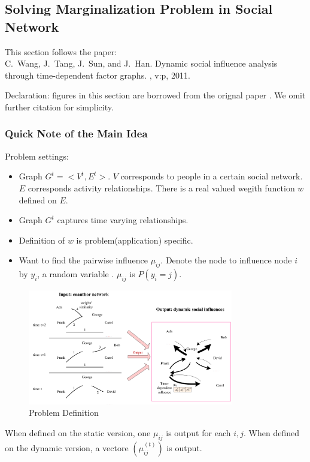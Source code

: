 \subsection{Solving Marginalization Problem in Social Network}
This section follows the paper:\\
C.~Wang, J.~Tang, J.~Sun, and J.~Han.
\newblock Dynamic social influence analysis through time-dependent factor
  graphs.
, v:p, 2011.

Declaration: figures in this section are borrowed from the orignal paper
\cite{wang2011-dynamic}. 
We omit further citation for simplicity. 

\subsubsection{Quick Note of the Main Idea}

Problem settings:
\begin{itemize}
	\item Graph $G^t=<V^t,E^t>$. $V$ corresponds to people in a certain 
	social network. $E$ corresponds activity relationships. There is 
	a real valued wegith function $w$ defined on $E$. 
	\item Graph $G^t$ captures time varying relationships. 
	\item Definition of $w$ is problem(application) specific. 
	\item Want to find the pairwise influence $\mu_{ij}$. Denote 
	the node to influence node $i$ by $y_i$, a random variable . 
	$\mu_{ij}$ is $P(y_i=j)$. 
\end{itemize}

\begin{figure}[htb]
\centering
	\includegraphics[width=0.8\textwidth]{fig/wang2011-problem.png}
	\caption{Problem Definition}
\end{figure}

When defined on the static version, one $\mu_{ij}$ is output for 
each $i,j$. When defined on the dynamic version, a vectore
$(\mu^{(t)}_{ij})$ is output. 

